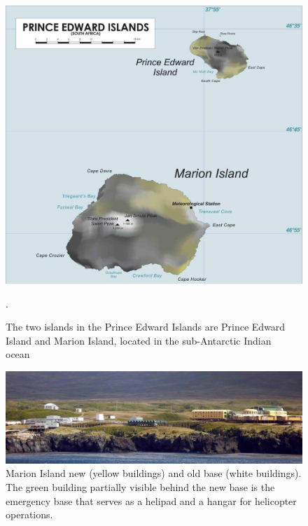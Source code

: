 \begin{figure}
	\centering
	\includegraphics[width=\linewidth]{Figures/marion}
	\caption{The two islands in the Prince Edward Islands are Prince Edward Island and Marion Island, located in the sub-Antarctic Indian ocean~\citep{PEI}}.
	\label{fig:marion}
\end{figure}

\begin{figure}
	\centering
	\includegraphics[width=\linewidth]{Figures/base}
	\caption{Marion Island new (yellow buildings) and old base (white buildings). The green building partially visible behind the new base is the emergency base that serves as a helipad and a hangar for helicopter operations.}
	\label{fig:base}
\end{figure}

